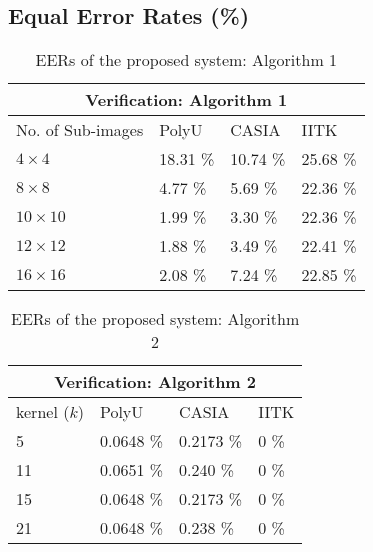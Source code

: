 \documentclass{beamer}
\begin{document}
\subsection*{Equal Error Rates (\%)}
\begin{frame}
\begin{table}[ht]
\centering 
\begin{tabular}{| l | l | l | l |}
    \hline
    \multicolumn{4}{|c|}{Verification: Algorithm 1}\\
    \hline
    No. of Sub-images & PolyU & CASIA & IITK \\ \hline
    $4 \times 4$      &  18.31 \%& 10.74 \% & 25.68 \%\\ \hline
    $8 \times 8$      &  4.77 \%& 5.69 \% & 22.36 \%\\ \hline
    $10 \times 10$    &  1.99 \%& 3.30 \% & 22.36 \%\\ \hline
    $12 \times 12$    &  1.88 \%& 3.49 \% & 22.41 \%\\ \hline
    $16 \times 16$    &  2.08 \%& 7.24 \% & 22.85 \%\\
    \hline
\end{tabular}
\caption{EERs of the proposed system: Algorithm 1\label{table:v_accuracy_algorithm1}}
\end{table}

\begin{table}[ht]
\centering 
\begin{tabular}{| l | l | l | l |}
    \hline
    \multicolumn{4}{|c|}{Verification: Algorithm 2}\\
    \hline
    kernel ($k$) & PolyU & CASIA & IITK \\ \hline
    5 		&  0.0648 \%	& 0.2173 \%      & 0 \% \\ \hline
    11		&  0.0651 \%	& 0.240 \%	& 0 \%\\ \hline
    15 		&  0.0648 \%	& 0.2173 \% 	& 0 \%\\ \hline
    21 		&  0.0648 \%	& 0.238 \% 	& 0 \%\\ 
    \hline
\end{tabular}
\caption{EERs of the proposed system: Algorithm 2\label{table:v_accuracy_algorithm2}}
\end{table}
\end{frame}
\end{document}
